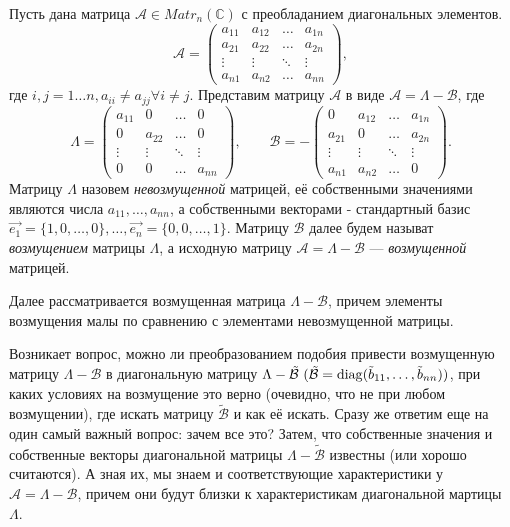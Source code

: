 Пусть дана матрица $\mathcal{A} \in Matr_{n}(\mathbb{C})$ с преобладанием диагональных элементов.
$$
\mathcal{A} = \begin{pmatrix}
a_{11} & a_{12} & \dots & a_{1n} \\
a_{21} & a_{22} & \dots & a_{2n} \\
\vdots & \vdots & \ddots & \vdots \\
a_{n1} & a_{n2} & \dots & a_{nn}
\end{pmatrix},
$$
где $i,j = 1 \dots n, a_{ii} \ne a_{jj} \forall i \ne j$.
Представим матрицу $\mathcal{A}$ в виде $\mathcal{A} = \Lambda - \mathcal{B}$, где
$$
\Lambda = \begin{pmatrix}
a_{11} &   0    & \dots  &   0    \\
  0    & a_{22} & \dots  &   0    \\
\vdots & \vdots & \ddots & \vdots \\
  0    &   0    & \dots  & a_{nn}
\end{pmatrix},
\qquad 
\mathcal{B} = -\begin{pmatrix}
  0    & a_{12} & \dots  & a_{1n} \\
a_{21} &   0    & \dots  & a_{2n} \\
\vdots & \vdots & \ddots & \vdots \\
a_{n1} & a_{n2} & \dots  &   0
\end{pmatrix}.
$$
Матрицу $\Lambda$ назовем {\em невозмущенной} матрицей, её собственными значениями являются числа $a_{11}, \dots , a_{nn}$,
а собственными векторами - стандартный базис $\vec{e_1} = \{1,0, \dots, 0\} , \dots , \vec{e_n} = \{0,0, \dots, 1\}$.
Матрицу $\mathcal{B}$ далее будем называт {\em возмущением} матрицы $\Lambda$, а исходную матрицу 
$\mathcal{A} = \Lambda - \mathcal{B}$ --- {\em возмущенной} матрицей.

Далее рассматривается возмущенная матрица $\Lambda - \mathcal{B}$, причем элементы возмущения малы по сравнению с элементами невозмущенной матрицы. 

Возникает вопрос, можно ли преобразованием подобия привести возмущенную матрицу $\Lambda - \mathcal{B}$ в диагональную матрицу
$\Lambda - \tilde{\mathcal{B}}\ (\tilde{\mathcal{B}} = \operatorname{diag}(\tilde{b}_{11}, \dots , \tilde{b}_{nn}))$, при каких условиях 
на возмущение это верно (очевидно, что не при любом возмущении), где искать матрицу $\tilde{\mathcal{B}}$ и как её искать.
Сразу же ответим еще на один самый важный вопрос: зачем все это? Затем, что собственные значения и собственные векторы диагональной
матрицы $\Lambda - \tilde{\mathcal{B}}$ известны (или хорошо считаются). А зная их, мы знаем и соответствующие характеристики у
$\mathcal{A} = \Lambda - \mathcal{B}$, причем они будут близки к характеристикам диагональной мартицы $\Lambda$.

